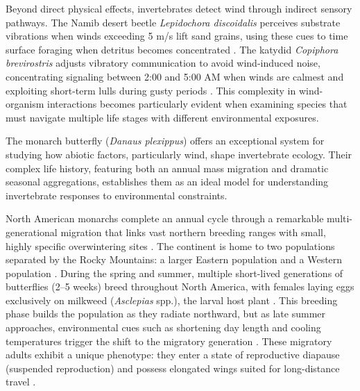 Beyond direct physical effects, invertebrates detect wind through indirect sensory pathways. The Namib desert beetle \textit{Lepidochora discoidalis} perceives substrate vibrations when winds exceeding 5 m/s lift sand grains, using these cues to time surface foraging when detritus becomes concentrated \citep{hanrahanEffectWindForaging1997}. The katydid \textit{Copiphora brevirostris} adjusts vibratory communication to avoid wind-induced noise, concentrating signaling between 2:00 and 5:00 AM when winds are calmest and exploiting short-term lulls during gusty periods \citep{velillaGoneWindSignal2020}. This complexity in wind-organism interactions becomes particularly evident when examining species that must navigate multiple life stages with different environmental exposures.

The monarch butterfly (\textit{Danaus plexippus}) offers an exceptional system for studying how abiotic factors, particularly wind, shape invertebrate ecology. Their complex life history, featuring both an annual mass migration and dramatic seasonal aggregations, establishes them as an ideal model for understanding invertebrate responses to environmental constraints.

North American monarchs complete an annual cycle through a remarkable multi-generational migration that links vast northern breeding ranges with small, highly specific overwintering sites \citep{browerUnderstandingMisunderstandingMigration1995}. The continent is home to two populations separated by the Rocky Mountains: a larger Eastern population and a Western population \citep{browerUnderstandingMisunderstandingMigration1995}. During the spring and summer, multiple short-lived generations of butterflies (2--5 weeks) breed throughout North America, with females laying eggs exclusively on milkweed (\textit{Asclepias} spp.), the larval host plant \citep{zaluckiTemperatureRateDevelopment1982,cockrellTimeTemperatureLatitudinal1993}. This breeding phase builds the population as they radiate northward, but as late summer approaches, environmental cues such as shortening day length and cooling temperatures trigger the shift to the migratory generation \citep{reppertDemystifyingMonarchButterfly2018}. These migratory adults exhibit a unique phenotype: they enter a state of reproductive diapause (suspended reproduction) and possess elongated wings suited for long-distance travel \citep{barkerEffectPhotoperiodTemperature1976}.

